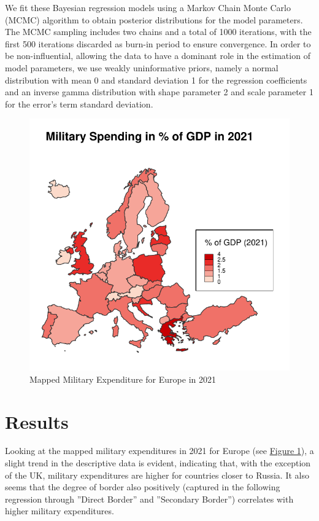 \documentclass[12pt,a4paper]{article}
\begin{document}
We fit these Bayesian regression models using a Markov Chain Monte Carlo (MCMC) algorithm to obtain posterior distributions for the model parameters. The MCMC sampling includes two chains and a total of 1000 iterations, with the first 500 iterations discarded as burn-in period to ensure convergence. In order to be non-influential, allowing the data to have a dominant role in the estimation of model parameters, we use weakly uninformative priors, namely a normal distribution with mean 0 and standard deviation 1 for the regression coefficients and an inverse gamma distribution with shape parameter 2 and scale parameter 1 for the error's term standard deviation.
\begin{figure}[h]
\center
\label{F:1}
\includegraphics[scale=0.75]{Map1.pdf}
\caption{Mapped Military Expenditure for Europe in 2021}
\end{figure}
\section{Results}
Looking at the mapped military expenditures in 2021 for Europe (see \hyperref[F:1]{\color{blue}Figure 1}), a slight trend in the descriptive data is evident, indicating that, with the exception of the UK, military expenditures are higher for countries closer to Russia. It also seems that the degree of border also positively (captured in the following regression through ''Direct Border'' and ''Secondary Border'') correlates with higher military expenditures. 
\end{document}
